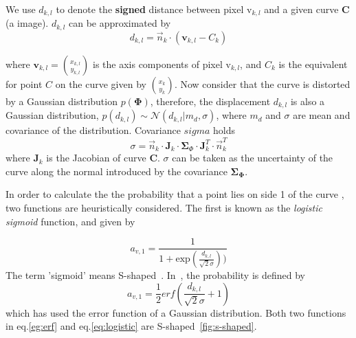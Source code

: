 We use $d_{k,l}$ to denote the \textbf{signed} distance between pixel
$\mathrm{v}_{k,l}$ and a given curve $\mathbf{C}$(a image). $d_{k,l}$
can be approximated by
\begin{equation}
  \label{eq:dis}
  d_{k,l} = \vec{n}_k \cdot ( \mathbf{v}_{k,l} - C_k)
\end{equation}

where $\mathbf{v}_{k,l} = {x_{k,l} \choose y_{k,l}}$ is the axis components of pixel
$\mathrm{v}_{k,l}$, and $C_k$ is the equivalent for point $C$ on the
curve given by ${x_k \choose y_k}$. Now consider that the curve is
distorted by a Gaussian distribution $p(\mathbf{\Phi})$, therefore, the
displacement $d_{k,l}$ is also a Gaussian distribution, $p(d_{k,l}) \sim
\mathcal{N}(d_{k,l}|m_d, \sigma)$, where $m_d$ and $\sigma$ are mean
and covariance of the distribution. Covariance $sigma$ holds
\begin{equation}
  \label{eq:cov}
  \sigma = \vec{n}_k \cdot \mathbf{J}_k \cdot \mathbf{\Sigma}_{\Phi}
  \cdot \mathbf{J}_k^T \cdot \vec{n}_k^T
\end{equation}
where $\mathbf{J}_k$ is the Jacobian of curve $\mathbf{C}$. $\sigma$
can be taken as the uncertainty of the curve along the normal
introduced by the covariance $\mathbf{\Sigma}_{\mathbf{\Phi}}$.

In order to calculate the the probability that a point lies on side 1 of the curve
, two functions are heuristically considered. The first is known as
the \textit{logistic sigmoid} function, and given by

\begin{equation}
  \label{eq:logistic}
  a_{v,1} = \frac{1}{1+\mathrm{exp}(\frac{d_{k,l}}{\sqrt{2}\sigma}))}
\end{equation}
The term 'sigmoid' means
S-shaped~\cite{bishop2006pattern}. In~\cite{hanek2004contracting}, 
the probability is defined by
\begin{equation}
  \label{eq:erf}
  a_{v,1} = \frac{1}{2}erf(\frac{d_{k,l}}{\sqrt{2}\sigma} + 1)
\end{equation}
which has used the error function of a Gaussian distribution. Both
two functions in eq.\ref{eg:erf} and eq.\ref{eq:logistic} are
S-shaped~\ref{fig:s-shaped}.

